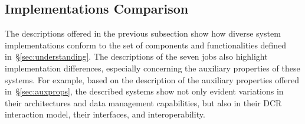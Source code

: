 \documentclass{sig-alternate}
\begin{document}
%
\subsection{Implementations Comparison}
\label{sec:context}





The descriptions offered in the previous subsection show how diverse \pilot
system implementations conform to the set of components and functionalities
defined in~\S\ref{sec:understanding}.  The descriptions of the seven \pilot jobs
also highlight implementation differences, especially concerning the auxiliary
properties of these \pilot systems. For example, based on the description of the
auxiliary properties offered in~\S\ref{sec:auxprops}, the described \pilot
systems show not only evident variations in their architectures and data
management capabilities, but also in their DCR interaction model, their
interfaces, and interoperability.
\end{document}
